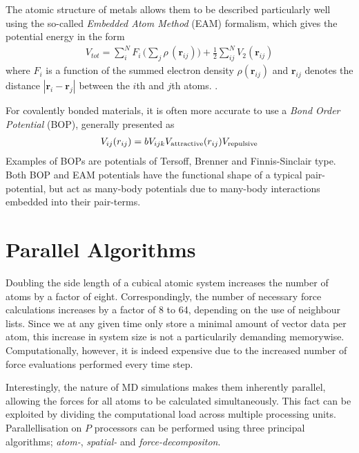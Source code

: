 The atomic structure of metals allows them to be described particularly well using the so-called \textit{Embedded Atom Method} (EAM) formalism, which gives the potential energy in the form
\begin{align}
V_{tot} = \sum_i^N F_i\, \bigg( \sum_j \rho\, (\mathbf{r}_{ij}) \bigg) + \frac{1}{2} \sum^N_{ij} V_2 (\mathbf{r}_{ij})
\end{align}
where  $F_i$ is a function of the summed electron density $\rho (\mathbf{r}_{ij})$ and $\mathbf{r}_{ij}$ denotes the distance $| \mathbf{r}_i - \mathbf{r}_j |$ between the $i$th and $j$th atoms. \cite{EAMmodel,dudarevEAMpotential}. 

For covalently bonded materials, it is often more accurate to use a \textit{Bond Order Potential} (BOP), generally presented as
\begin{align}
V_{ij}(r_{ij}) =bV_{ijk}V_{\rm attractive}(r_{ij}) V_ {\rm repulsive}
\end{align}
Examples of BOPs are potentials of Tersoff, Brenner and Finnis-Sinclair type. \cite{tersoff1988new, brenner1990empirical, finnis1984simple} Both BOP and EAM potentials have the functional shape of a typical pair-potential, but act as many-body potentials due to many-body interactions embedded into their pair-terms.

\section{Parallel Algorithms}
Doubling the side length of a cubical atomic system increases the number of atoms by a factor of eight. 
Correspondingly, the number of necessary force calculations increases by a factor of  8 to 64, depending on the use of neighbour lists.
Since we at any given time only store a minimal amount of vector data per atom, this increase in system size is not a particularily demanding memorywise.
Computationally, however, it is indeed expensive due to the increased number of force evaluations performed every time step.

Interestingly, the nature of MD simulations makes them inherently parallel, allowing the forces for all atoms to be calculated simultaneously. 
This fact can be exploited by dividing the computational load across multiple processing units. 
Parallellisation on $P$ processors can be performed using three principal algorithms; \textit{atom-}, \textit{spatial-} and \textit{force-decompositon}. 
\cite{fincham1987parallel}

